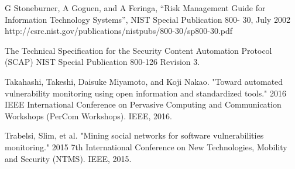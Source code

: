 \documentclass{llncs}
\begin{document}
\newpage
\begin{thebibliography}{[MT1]}

%


G Stoneburner, A Goguen, and A Feringa, “Risk Management Guide
for Information Technology Systems”, NIST Special Publication 800-
30, July 2002
http://csrc.nist.gov/publications/nistpubs/800-30/sp800-30.pdf

The Technical Specification for the
Security Content Automation Protocol (SCAP)
NIST Special Publication 800-126
Revision 3.

Takahashi, Takeshi, Daisuke Miyamoto, and Koji Nakao. "Toward automated vulnerability monitoring using open information and standardized tools." 2016 IEEE International Conference on Pervasive Computing and Communication Workshops (PerCom Workshops). IEEE, 2016.

Trabelsi, Slim, et al. "Mining social networks for software vulnerabilities monitoring." 2015 7th International Conference on New Technologies, Mobility and Security (NTMS). IEEE, 2015.
%
\end{thebibliography}
\end{document}
